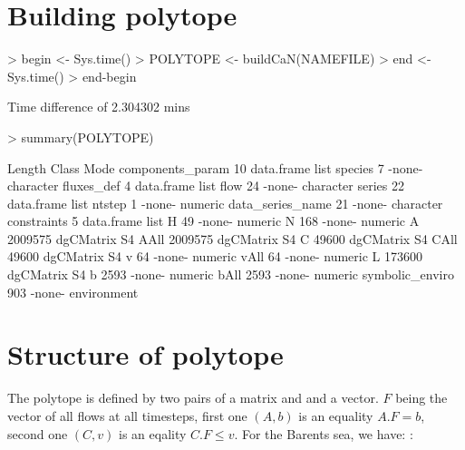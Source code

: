 \documentclass{article}
\begin{document}
\section{Building polytope}

\begin{Schunk}
\begin{Sinput}
> begin <- Sys.time()
> POLYTOPE <- buildCaN(NAMEFILE)
> end <- Sys.time()
> end-begin
\end{Sinput}
\begin{Soutput}
Time difference of 2.304302 mins
\end{Soutput}
\begin{Sinput}
> summary(POLYTOPE)
\end{Sinput}
\begin{Soutput}
                 Length  Class      Mode       
components_param      10 data.frame list       
species                7 -none-     character  
fluxes_def             4 data.frame list       
flow                  24 -none-     character  
series                22 data.frame list       
ntstep                 1 -none-     numeric    
data_series_name      21 -none-     character  
constraints            5 data.frame list       
H                     49 -none-     numeric    
N                    168 -none-     numeric    
A                2009575 dgCMatrix  S4         
AAll             2009575 dgCMatrix  S4         
C                  49600 dgCMatrix  S4         
CAll               49600 dgCMatrix  S4         
v                     64 -none-     numeric    
vAll                  64 -none-     numeric    
L                 173600 dgCMatrix  S4         
b                   2593 -none-     numeric    
bAll                2593 -none-     numeric    
symbolic_enviro      903 -none-     environment
\end{Soutput}
\end{Schunk}

\section{Structure of polytope}

The polytope is defined by two pairs of a matrix and and a vector. $F$ being the vector of all flows at all timesteps, first one $(A,b)$ is an equality $ A.F = b$, second one $(C,v)$ is an eqality  $ C.F \le v$. For the Barents sea, we have: :
\end{document}
